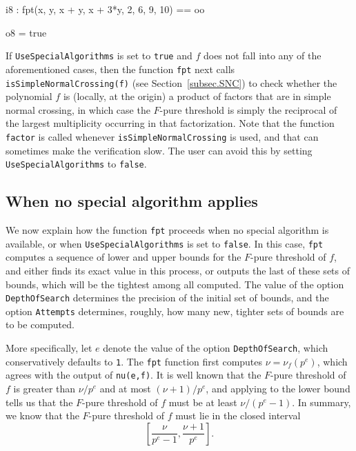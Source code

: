 \documentclass{amsart}
\begin{document}
\smallskip
{\small
{}
\begin{MyVerbatim}
i8 : fpt({x, y, x + y, x + 3*y}, {2, 6, 9, 10}) == oo

o8 = true
\end{MyVerbatim}
}
\smallskip

If \texttt{UseSpecialAlgorithms} is set to \texttt{true} and $f$ does not fall into any of the aforementioned cases, then the function \texttt{fpt} next calls \texttt{isSimpleNormalCrossing(f)} (see Section~\ref{subsec.SNC}) to check whether the polynomial $f$ is (locally, at the origin) a product of factors that are in simple normal crossing, in which case the $F$-pure threshold is simply the reciprocal of the largest multiplicity occurring in that factorization.  
Note that the function \texttt{factor} is called whenever \texttt{isSimpleNormalCrossing} is used, and that can sometimes make the verification slow.  The user can avoid this by setting \texttt{UseSpecialAlgorithms} to \texttt{false}.

\subsection{When no special algorithm applies}

We now explain how the function  \texttt{fpt} proceeds when no special algorithm is available, or when \texttt{UseSpecialAlgorithms} is set to \texttt{false}.
In this case, \texttt{fpt} computes a sequence of lower and upper bounds for the $F$-pure threshold of $f$, and either finds its exact value in this process, or outputs the last of these sets of bounds, which will be the tightest among all computed.
The value of the option \texttt{DepthOfSearch} determines the precision of the initial set of bounds, and the option \texttt{Attempts} determines, roughly, how many new, tighter sets of bounds are to be computed.

More specifically, let $e$ denote the value of the option \texttt{DepthOfSearch}, which conservatively defaults to \texttt{1}.
The \texttt{fpt} function first computes $\nu=\nu_f(p^e)$, which agrees with the output of \texttt{nu(e,f)}.
It is well known that the $F$-pure threshold of $f$ is greater than $\nu/p^e$ and at most $(\nu+1)/p^e$, and applying  \cite[Proposition 4.2]{HernandezFPurityOfHypersurfaces} to the lower bound tells us that the $F$-pure threshold of $f$ must be at least $\nu/(p^e-1)$.
In summary, we know that the $F$-pure threshold of $f$ must lie in the closed interval
%
\begin{equation}
\label{estimating-interval: e}
\tag{$\dagger$}
\left[ \frac{\nu}{p^e-1}, \frac{\nu+1}{p^e} \right].
\end{equation}
\end{document}

